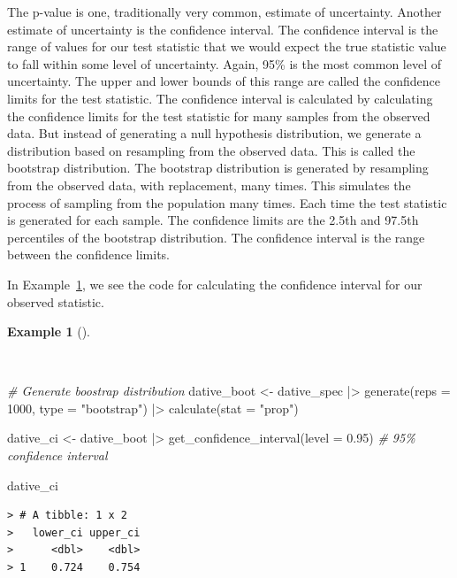 \documentclass[
  letterpaper,
  DIV=11,
  numbers=noendperiod]{scrreprt}
\newenvironment{Shaded}{\begin{snugshade}}{\end{snugshade}}
\newcommand{\AttributeTok}[1]{\textcolor[rgb]{0.00,0.00,0.00}{#1}}
\newcommand{\CommentTok}[1]{\textcolor[rgb]{0.00,0.00,0.00}{\textit{#1}}}
\newcommand{\DecValTok}[1]{\textcolor[rgb]{0.00,0.00,0.00}{#1}}
\newcommand{\FloatTok}[1]{\textcolor[rgb]{0.00,0.00,0.00}{#1}}
\newcommand{\FunctionTok}[1]{\textcolor[rgb]{0.00,0.00,0.00}{#1}}
\newcommand{\NormalTok}[1]{\textcolor[rgb]{0.00,0.00,0.00}{#1}}
\newcommand{\OtherTok}[1]{\textcolor[rgb]{0.00,0.00,0.00}{#1}}
\newcommand{\SpecialCharTok}[1]{\textcolor[rgb]{0.00,0.00,0.00}{#1}}
\newcommand{\StringTok}[1]{\textcolor[rgb]{0.00,0.00,0.00}{#1}}
\theoremstyle{definition}
\newtheorem{example}{Example}[chapter]
\theoremstyle{remark}
\begin{document}
The p-value is one, traditionally very common, estimate of uncertainty.
Another estimate of uncertainty is the confidence interval. The
confidence interval is the range of values for our test statistic that
we would expect the true statistic value to fall within some level of
uncertainty. Again, 95\% is the most common level of uncertainty. The
upper and lower bounds of this range are called the confidence limits
for the test statistic. The confidence interval is calculated by
calculating the confidence limits for the test statistic for many
samples from the observed data. But instead of generating a null
hypothesis distribution, we generate a distribution based on resampling
from the observed data. This is called the bootstrap distribution. The
bootstrap distribution is generated by resampling from the observed
data, with replacement, many times. This simulates the process of
sampling from the population many times. Each time the test statistic is
generated for each sample. The confidence limits are the 2.5th and
97.5th percentiles of the bootstrap distribution. The confidence
interval is the range between the confidence limits.

In Example~\ref{exm-ida-cat-confidence-interval}, we see the code for
calculating the confidence interval for our observed statistic.

\begin{example}[]\protect\hypertarget{exm-ida-cat-confidence-interval}{}\label{exm-ida-cat-confidence-interval}

~

\begin{Shaded}
\begin{Highlighting}[]
\CommentTok{\# Generate boostrap distribution}
\NormalTok{dative\_boot }\OtherTok{\textless{}{-}}
\NormalTok{  dative\_spec }\SpecialCharTok{|\textgreater{}}
  \FunctionTok{generate}\NormalTok{(}\AttributeTok{reps =} \DecValTok{1000}\NormalTok{, }\AttributeTok{type =} \StringTok{"bootstrap"}\NormalTok{) }\SpecialCharTok{|\textgreater{}}
  \FunctionTok{calculate}\NormalTok{(}\AttributeTok{stat =} \StringTok{"prop"}\NormalTok{)}

\NormalTok{dative\_ci }\OtherTok{\textless{}{-}}
\NormalTok{  dative\_boot }\SpecialCharTok{|\textgreater{}}
  \FunctionTok{get\_confidence\_interval}\NormalTok{(}\AttributeTok{level =} \FloatTok{0.95}\NormalTok{) }\CommentTok{\# 95\% confidence interval}

\NormalTok{dative\_ci}
\end{Highlighting}
\end{Shaded}

\begin{verbatim}
> # A tibble: 1 x 2
>   lower_ci upper_ci
>      <dbl>    <dbl>
> 1    0.724    0.754
\end{verbatim}

\end{example}
\end{document}
